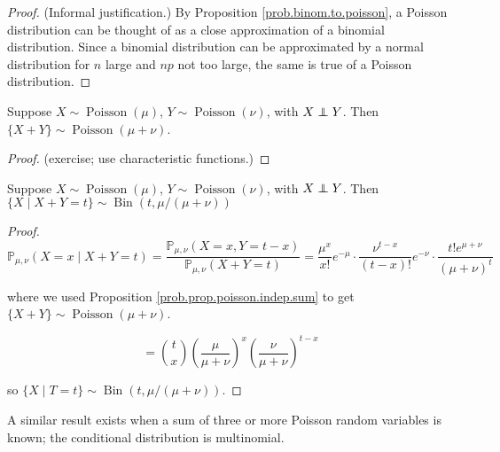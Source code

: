 \begin{proof}
(Informal justification.) By Proposition \ref{prob.binom.to.poisson}, a Poisson distribution can be thought of as a close approximation of a binomial distribution. Since a binomial distribution can be approximated by a normal distribution for \(n\) large and \(np\) not too large, the same is true of a Poisson distribution.
\end{proof}

\begin{proposition}\label{prob.prop.poisson.indep.sum} Suppose \(X \sim \operatorname{Poisson}(\mu)\), \(Y \sim \operatorname{Poisson}(\nu)\), with \(X \indep Y\). Then \(\{X + Y\} \sim \operatorname{Poisson}(\mu + \nu)\).
\end{proposition}

\begin{proof}

(exercise; use characteristic functions.)

\end{proof}

\begin{proposition}\label{prob.pois.bin.cond}

Suppose \(X \sim \operatorname{Poisson}(\mu)\), \(Y \sim \operatorname{Poisson}(\nu)\), with \(X \indep Y\). Then \(\{X \mid X + Y = t\} \sim \operatorname{Bin}(t, \mu/(\mu + \nu))\)

\end{proposition}

\begin{proof}

\[
\mathbb{P}_{\mu, \nu} (X = x \mid X + Y = t) = \frac{\mathbb{P}_{\mu, \nu} (X = x , Y = t - x) }{\mathbb{P}_{\mu, \nu} (X + Y = t) } = \frac{\mu^x}{x!} e^{-\mu} \cdot \frac{ \nu^{t-x}}{(t-x)!} e^{-\nu} \cdot \frac{t! e^{\mu + \nu} }{(\mu + \nu)^t}
\]

where we used Proposition \ref{prob.prop.poisson.indep.sum}  to get \(\{X + Y\} \sim \operatorname{Poisson}(\mu + \nu)\).

\[
= \binom{t}{x} \left( \frac{\mu}{\mu + \nu} \right)^x \left( \frac{\nu}{\mu + \nu} \right)^{t-x}
\]

so \(\{X \mid T = t\} \sim \operatorname{Bin}(t, \mu/(\mu + \nu))\). 

\end{proof}

\begin{remark}

A similar result exists when a sum of three or more Poisson random variables is known; the conditional distribution is multinomial.

\end{remark}

